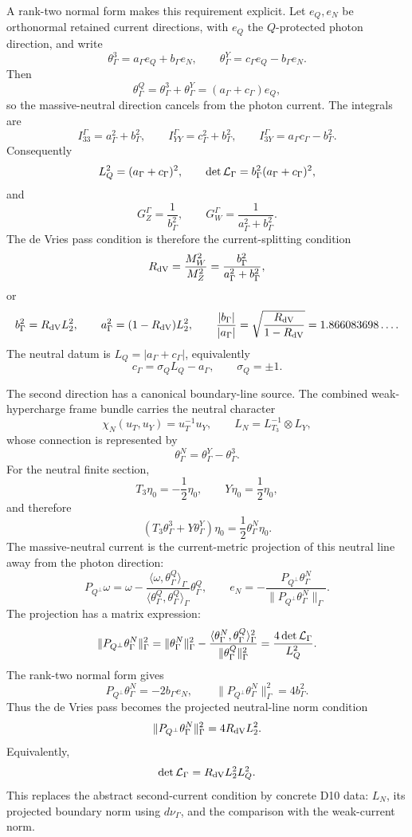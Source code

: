 \documentclass[11pt]{article}
\theoremstyle{definition}
\theoremstyle{remark}
\begin{document}
A rank-two normal form makes this requirement explicit.  Let \(e_Q,e_N\) be
orthonormal retained current directions, with \(e_Q\) the \(Q\)-protected
photon direction, and write
\[
  \theta_\Gamma^3=a_\Gamma e_Q+b_\Gamma e_N,
  \qquad
  \theta_\Gamma^Y=c_\Gamma e_Q-b_\Gamma e_N.
\]
Then
\[
  \theta_\Gamma^Q=\theta_\Gamma^3+\theta_\Gamma^Y
  =
  (a_\Gamma+c_\Gamma)e_Q,
\]
so the massive-neutral direction cancels from the photon current.  The
integrals are
\[
  I_{33}^\Gamma=a_\Gamma^2+b_\Gamma^2,
  \qquad
  I_{YY}^\Gamma=c_\Gamma^2+b_\Gamma^2,
  \qquad
  I_{3Y}^\Gamma=a_\Gamma c_\Gamma-b_\Gamma^2.
\]
Consequently
\[
  L_Q^2=(a_\Gamma+c_\Gamma)^2,
  \qquad
  \det{\cal L}_\Gamma=b_\Gamma^2(a_\Gamma+c_\Gamma)^2,
\]
and
\[
  G_Z^\Gamma=\frac{1}{b_\Gamma^2},
  \qquad
  G_W^\Gamma=\frac{1}{a_\Gamma^2+b_\Gamma^2}.
\]
The de Vries pass condition is therefore the current-splitting condition
\[
  R_{\rm dV}
  =
  \frac{M_W^2}{M_Z^2}
  =
  \frac{b_\Gamma^2}{a_\Gamma^2+b_\Gamma^2},
\]
or
\[
  b_\Gamma^2=R_{\rm dV}L_2^2,
  \qquad
  a_\Gamma^2=(1-R_{\rm dV})L_2^2,
  \qquad
  \frac{|b_\Gamma|}{|a_\Gamma|}
  =
  \sqrt{\frac{R_{\rm dV}}{1-R_{\rm dV}}}
  =
  1.866083698\ldots .
\]
The neutral datum is \(L_Q=|a_\Gamma+c_\Gamma|\), equivalently
\[
  c_\Gamma=\sigma_Q L_Q-a_\Gamma,\qquad \sigma_Q=\pm1.
\]

The second direction has a canonical boundary-line source.  The combined
weak-hypercharge frame bundle carries the neutral character
\[
  \chi_N(u_T,u_Y)=u_T^{-1}u_Y,
  \qquad
  L_N=L_{T_3}^{-1}\otimes L_Y,
\]
whose connection is represented by
\[
  \theta_\Gamma^N=\theta_\Gamma^Y-\theta_\Gamma^3.
\]
For the neutral finite section,
\[
  T_3\eta_0=-\frac12\eta_0,
  \qquad
  Y\eta_0=\frac12\eta_0,
\]
and therefore
\[
  (T_3\theta_\Gamma^3+Y\theta_\Gamma^Y)\eta_0
  =
  \frac12\theta_\Gamma^N\eta_0.
\]
The massive-neutral current is the current-metric projection of this neutral
line away from the photon direction:
\[
  P_{Q^\perp}\omega
  =
  \omega
  -
  \frac{\langle \omega,\theta_\Gamma^Q\rangle_\Gamma}
       {\langle \theta_\Gamma^Q,\theta_\Gamma^Q\rangle_\Gamma}
  \theta_\Gamma^Q ,
  \qquad
  e_N
  =
  -\frac{P_{Q^\perp}\theta_\Gamma^N}
        {\|P_{Q^\perp}\theta_\Gamma^N\|_\Gamma}.
\]
The projection has a matrix expression:
\[
  \|P_{Q^\perp}\theta_\Gamma^N\|_\Gamma^2
  =
  \|\theta_\Gamma^N\|_\Gamma^2
  -
  \frac{\langle\theta_\Gamma^N,\theta_\Gamma^Q\rangle_\Gamma^2}
       {\|\theta_\Gamma^Q\|_\Gamma^2}
  =
  \frac{4\det{\cal L}_\Gamma}{L_Q^2}.
\]
The rank-two normal form gives
\[
  P_{Q^\perp}\theta_\Gamma^N=-2b_\Gamma e_N,
  \qquad
  \|P_{Q^\perp}\theta_\Gamma^N\|_\Gamma^2=4b_\Gamma^2.
\]
Thus the de Vries pass becomes the projected neutral-line norm condition
\[
  \|P_{Q^\perp}\theta_\Gamma^N\|_\Gamma^2
  =
  4R_{\rm dV}L_2^2.
\]
Equivalently,
\[
  \det{\cal L}_\Gamma=R_{\rm dV}L_2^2L_Q^2.
\]
This replaces the abstract second-current condition by concrete D10 data:
\(L_N\), its projected boundary norm using \(d\nu_\Gamma\), and the
comparison with the weak-current norm.
\end{document}
